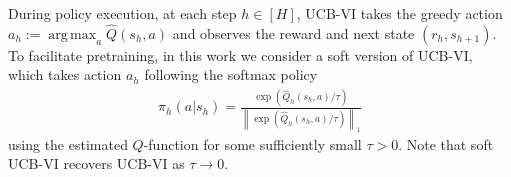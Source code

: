 \documentclass[10pt]{article}
\DeclareMathOperator*{\argmax}{arg\,max}
\newcommand{\norm}[1]{\left\|{#1}\right\|}
\newcommand{\lone}[1]{\norm{#1}_1}
\newcommand{\<}{\left\langle}
\renewcommand{\>}{\right\rangle}
\newcommand{\temp}{{\tau}}
\newcommand{\state}{{s}}
\newcommand{\action}{{a}}
\newcommand{\reward}{{r}}
\newcommand{\plc}{{\pi}}
\newcommand{\horizon}{{H}}
\renewcommand{\horizon}{{H}}
\newcommand{\Qfun}{{Q}}
\newcommand{\trestQfun}{{\widehat{\Qfun}}}
\begin{document}
During policy execution, at each step $h\in[\horizon]$, UCB-VI takes the greedy action $\action_h:=\argmax_{\action}\trestQfun(\state_h,\action)$ and observes the reward and next state $(\reward_h,\state_{h+1})$. To facilitate pretraining, in this work we consider a soft version of UCB-VI, which takes action $\action_h$  following the softmax policy 
\begin{align*}
\plc_h(\action|\state_h)=\frac{\exp(\trestQfun_h(\state_h,\action)/\temp)}{\lone{\exp(\trestQfun_h(\state_h,\action)/\temp)}}
\end{align*}
using the estimated $Q$-function for some sufficiently small $\temp>0$. Note that soft UCB-VI recovers UCB-VI as $\temp\to 0$.
\end{document}
